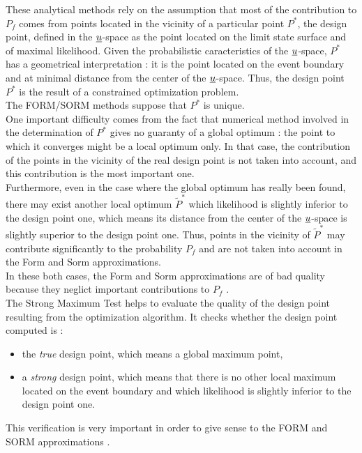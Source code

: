 {  These analytical methods rely on the assumption that most of the contribution to $P_f$ comes from points located in the vicinity of a particular point $P^*$, the design point, defined in the ${\underline{u}}$-space as the point located on the limit state surface and of maximal likelihood. Given the probabilistic caracteristics of the ${\underline{u}}$-space, $P^*$ has a geometrical interpretation : it is the point located on the event boundary and at minimal distance from the center of the ${\underline{u}}$-space. Thus, the design point $P^*$ is the result of a constrained optimization problem.\\

  The FORM/SORM methods suppose that $P^*$ is unique.\\

  One important difficulty comes from the fact that numerical method involved in the determination of $P^*$ gives no guaranty of a global optimum : the point to which it converges might be a local optimum only. In that case, the contribution of the points in the vicinity of the real design point is not taken into account, and this contribution is the most important one.\\
  Furthermore, even in the case where the global optimum has really been found, there may exist another local optimum $\tilde{P}^*$ which likelihood is slightly inferior to the design point one, which means its distance from the center of the ${\underline{u}}$-space  is slightly superior to the design point one. Thus, points in the vicinity of $\tilde{P}^*$ may contribute significantly to the probability $P_f$ and are not taken into account in the Form and Sorm approximations. \\
  In these both cases, the Form and Sorm approximations are of bad quality because they neglict  important contributions to $P_f$ .\\

  The Strong Maximum Test helps to evaluate the quality of the design point resulting from the optimization algorithm. It checks whether the design point computed is :
  \begin{itemize}
  \item the {\em true} design point, which means a global maximum point,
  \item a {\em strong} design point, which means that there is no other local maximum located on the event boundary and which likelihood is slightly inferior to the design point one.
  \end{itemize}
  This verification is very important in order to give sense to the FORM and SORM approximations .\\

}

